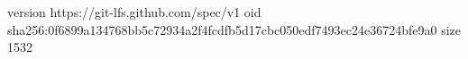 version https://git-lfs.github.com/spec/v1
oid sha256:0f6899a134768bb5c72934a2f4fcdfb5d17cbc050edf7493ec24e36724bfe9a0
size 1532
